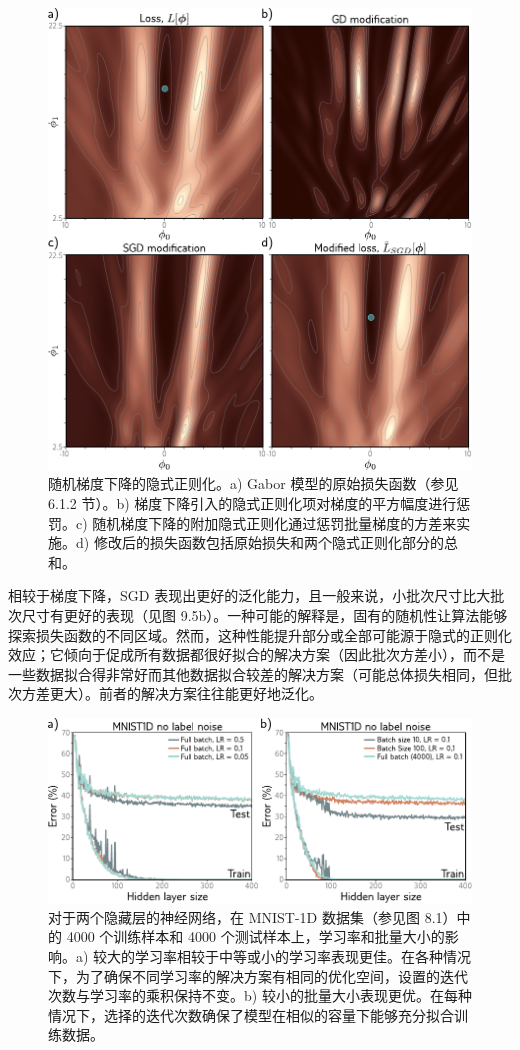 \documentclass[lang=cn,newtx,10pt,scheme=chinese]{elegantbook}
\begin{document}
\begin{figure}[ht!]
	\centering
	\includegraphics[width=0.7\linewidth]{PDFFigures/UDLChap9PDF/RegImplicit2.pdf}
	\caption{随机梯度下降的隐式正则化。a) Gabor 模型的原始损失函数（参见 6.1.2 节）。b) 梯度下降引入的隐式正则化项对梯度的平方幅度进行惩罚。c) 随机梯度下降的附加隐式正则化通过惩罚批量梯度的方差来实施。d) 修改后的损失函数包括原始损失和两个隐式正则化部分的总和。}
\end{figure}


相较于梯度下降，SGD 表现出更好的泛化能力，且一般来说，小批次尺寸比大批次尺寸有更好的表现（见图 9.5b）。一种可能的解释是，固有的随机性让算法能够探索损失函数的不同区域。然而，这种性能提升部分或全部可能源于隐式的正则化效应；它倾向于促成所有数据都很好拟合的解决方案（因此批次方差小），而不是一些数据拟合得非常好而其他数据拟合较差的解决方案（可能总体损失相同，但批次方差更大）。前者的解决方案往往能更好地泛化。

\begin{figure}[ht!]
	\centering
	\includegraphics[width=0.7\linewidth]{PDFFigures/UDLChap9PDF/RegLR.pdf}
	\caption{对于两个隐藏层的神经网络，在 MNIST-1D 数据集（参见图 8.1）中的 4000 个训练样本和 4000 个测试样本上，学习率和批量大小的影响。a) 较大的学习率相较于中等或小的学习率表现更佳。在各种情况下，为了确保不同学习率的解决方案有相同的优化空间，设置的迭代次数与学习率的乘积保持不变。b) 较小的批量大小表现更优。在每种情况下，选择的迭代次数确保了模型在相似的容量下能够充分拟合训练数据。}
\end{figure}
\end{document}
